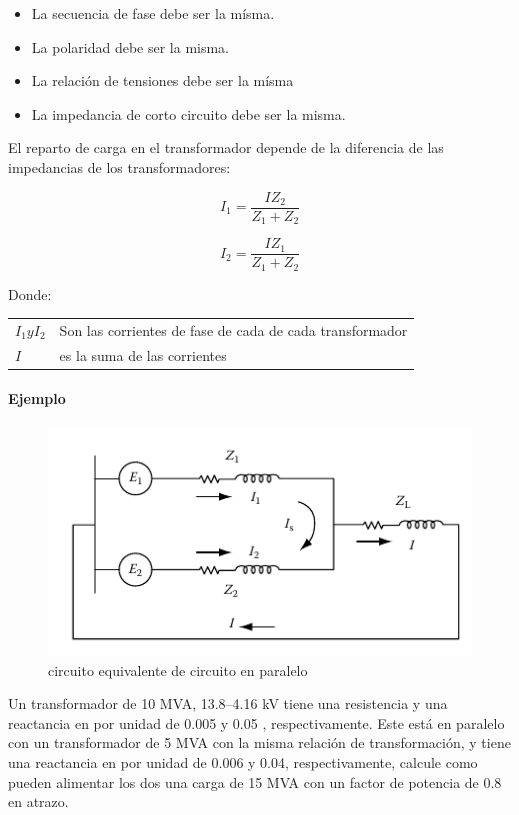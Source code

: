 \documentclass[a5paper]{book}%
\begin{document}
\begin{itemize}
\item La secuencia de fase debe ser la mísma.
\item La polaridad debe ser la misma.
\item La relación de tensiones debe ser la mísma
\item La impedancia de corto circuito debe ser la misma.
\end{itemize}

El reparto de carga en el transformador depende de la diferencia de
las impedancias de los transformadores:

\[ I_{1}= \dfrac{IZ_{2}}{Z_{1}+Z_{2}} \]

\[ I_{2}= \dfrac{IZ_{1}}{Z_{1}+Z_{2}} \]

Donde:

\begin{tabular}{ll}
  $I_{1} y I_{2}$ & Son las corrientes de fase de cada de cada transformador \\
  $I$& es la suma de las corrientes \\
\end{tabular}

\paragraph{Ejemplo}

\begin{figure}[H]
  \centering
  \includegraphics[width=\linewidth]{paralelo_trafo}
  \caption{circuito equivalente de circuito en paralelo}
  \label{fig:paralelo}
\end{figure}
Un transformador  de  10 MVA, 13.8–4.16 kV tiene una resistencia  y una reactancia en por unidad  de 0.005 y 0.05 , respectivamente. Este está en paralelo con un transformador de 5 MVA con la misma relación de transformación, y tiene una reactancia en por unidad de  0.006 y 0.04, respectivamente, calcule como pueden alimentar los dos una carga de 15 MVA con un factor de potencia de 0.8 en atrazo.
\end{document}
